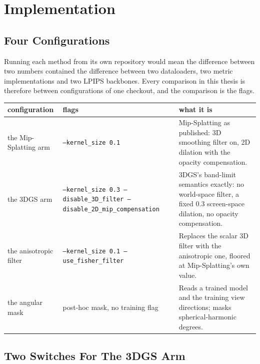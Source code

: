 \chapter{Implementation}
\label{app:impl}


\section{Four Configurations}

Running each method from its own repository would mean the difference between two
numbers contained the difference between two dataloaders, two metric
implementations and two LPIPS backbones. Every comparison in this thesis is
therefore between configurations of one checkout, and the comparison is the
flags.

\begin{center}\small
\begin{tabularx}{\linewidth}{L{0.65}L{1.25}L{1.10}}
  \toprule
  configuration & flags & what it is \\
  \midrule
  the Mip-Splatting arm & \texttt{--kernel\_size 0.1} &
    Mip-Splatting as published: 3D smoothing filter on, 2D dilation with the
    opacity compensation. \\
  the 3DGS arm & \texttt{--kernel\_size 0.3 --disable\_3D\_filter
                  --disable\_2D\_mip\_compensation} &
    3DGS's band-limit semantics exactly: no world-space filter, a fixed $0.3$
    screen-space dilation, no opacity compensation. \\
  the anisotropic filter & \texttt{--kernel\_size 0.1 --use\_fisher\_filter} &
    Replaces the scalar 3D filter with the anisotropic one, floored at
    Mip-Splatting's own value. \\
  the angular mask & post-hoc mask, no training flag &
    Reads a trained model and the training view directions; masks spherical-harmonic
    degrees. \\
  \bottomrule
\end{tabularx}
\end{center}

\section{Two Switches For The 3DGS Arm}

